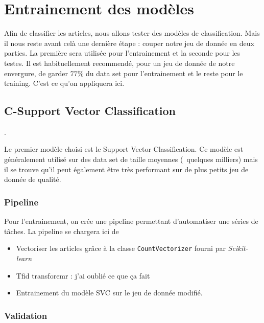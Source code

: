 \documentclass[a4paper,12pt]{article}
\begin{document}
\section{Entrainement des modèles}

Afin de classifier les articles, nous allons tester des modèles de classification. Mais il nous reste avant celà une dernière étape : couper notre jeu de donnée en deux parties. La première sera utilisée pour l'entrainement et la seconde pour les testes. Il est habituellement recommendé, pour un jeu de donnée de notre envergure, de garder $77\%$ du data set pour l'entrainement et le reste pour le training. C'est ce qu'on appliquera ici.\\

\subsection{C-Support Vector Classification}.

Le premier modèle choisi est le Support Vector Classification. Ce modèle est généralement utilisé sur des data set de taille moyennes (~quelques milliers) mais il se trouve qu'il peut également être très performant sur de plus petits jeu de donnée de qualité.\\

\subsubsection{Pipeline}

Pour l'entrainement, on crée une pipeline permettant d'automatiser une séries de tâches. La pipeline se chargera ici de
\begin{itemize}
\item Vectoriser les articles grâce à la classe \texttt{CountVectorizer} fourni par \textit{Scikit-learn}
\item Tfid transforemr : j'ai oublié ce que ça fait
\item Entrainement du modèle SVC sur le jeu de donnée modifié.
\end{itemize}

\subsubsection{Validation}
\end{document}
